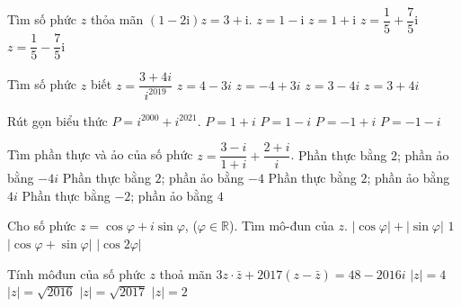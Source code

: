 \begin{ex}%
	Tìm số phức $z$ thỏa mãn $\left(1 - 2\mathrm{i}\right)z = 3 + \mathrm{i}$.
	\choice
	{$z = 1 - \mathrm{i}$}
	{$z = 1 + \mathrm{i}$}
	{\True $z = \dfrac{1}{5} + \dfrac{7}{5}\mathrm{i}$}
	{$z = \dfrac{1}{5} - \dfrac{7}{5}\mathrm{i}$}
\end{ex}
\begin{ex}%
	Tìm số phức $z$ biết $z=\dfrac{3+4i}{i^{2019}}$
	\choice
	{$z=4-3i$}
	{\True $z=-4+3i$}
	{$z=3-4i$}
	{$z=3+4i$}
\end{ex}
\begin{ex}%
	Rút gọn biểu thức $P=i^{2000}+i^{2021}$.
	\choice
	{\True $P=1+i$}
	{$P=1-i$}
	{$P=-1+i$}
	{$P=-1-i$}
\end{ex}
\begin{ex}%
	Tìm phần thực và ảo của số phức $z=\dfrac{3-i}{1+i}+\dfrac{2+i}{i}$.
	\choice%
	{Phần thực bằng $2$; phần ảo bằng $-4i$}
	{\True Phần thực bằng $2$; phần ảo bằng $-4$}
	{Phần thực bằng $2$; phần ảo bằng $4i$}
	{Phần thực bằng $-2$; phần ảo bằng $4$}
\end{ex}
\begin{ex}%
	Cho số phức $z= \cos \varphi + i \sin \varphi$, ($\varphi \in \mathbb{R}$). Tìm mô-đun của $z$.
	\choice
	{$|\cos \varphi | + |\sin \varphi |$}
	{\True $1$}
	{$|\cos \varphi + \sin \varphi |$}
	{$|\cos 2\varphi |$}
\end{ex}
\begin{ex}%
	Tính môđun của số phức $z$ thoả mãn $3z\cdot \bar{z}+2017\left(z-\bar{z}\right)=48-2016i$
	\choice
	{\True $|z|=4$}
	{$|z|=\sqrt{2016}$}
	{$|z|=\sqrt{2017}$}
	{$|z|=2$}
\end{ex}

